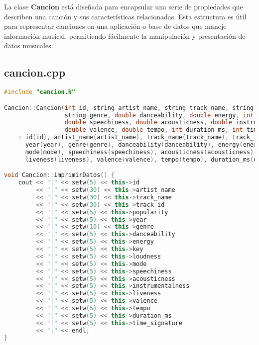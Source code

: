 \documentclass[corference]{IEEEtran}
\begin{document}
\begin{flushleft}
            \noindent\hspace*{4em}La clase \textbf{Cancion} está diseñada para encapsular una serie de propiedades que describen una canción y sus características relacionadas. Esta estructura es útil para representar canciones en una aplicación o base de datos que maneje información musical, permitiendo fácilmente la manipulación y presentación de datos musicales.
            \subsection{cancion.cpp}
            \begin{lstlisting}[language=C++, style=mystyle, caption={Código de un Clase Canción}]
#include "cancion.h"

Cancion::Cancion(int id, string artist_name, string track_name, string track_id, int popularity, int year,
                 string genre, double danceability, double energy, int key, double loudness, int mode,
                 double speechiness, double acousticness, double instrumentalness, double liveness,
                 double valence, double tempo, int duration_ms, int time_signature)
    : id(id), artist_name(artist_name), track_name(track_name), track_id(track_id), popularity(popularity),
      year(year), genre(genre), danceability(danceability), energy(energy), key(key), loudness(loudness),
      mode(mode), speechiness(speechiness), acousticness(acousticness), instrumentalness(instrumentalness),
      liveness(liveness), valence(valence), tempo(tempo), duration_ms(duration_ms), time_signature(time_signature) {}

void Cancion::imprimirDatos() {
    cout << "|" << setw(5) << this->id
         << "|" << setw(30) << this->artist_name
         << "|" << setw(30) << this->track_name
         << "|" << setw(30) << this->track_id
         << "|" << setw(5) << this->popularity
         << "|" << setw(5) << this->year
         << "|" << setw(10) << this->genre
         << "|" << setw(5) << this->danceability
         << "|" << setw(5) << this->energy
         << "|" << setw(5) << this->key
         << "|" << setw(5) << this->loudness
         << "|" << setw(5) << this->mode
         << "|" << setw(5) << this->speechiness
         << "|" << setw(5) << this->acousticness
         << "|" << setw(5) << this->instrumentalness
         << "|" << setw(5) << this->liveness
         << "|" << setw(5) << this->valence
         << "|" << setw(5) << this->tempo
         << "|" << setw(5) << this->duration_ms
         << "|" << setw(5) << this->time_signature
         << "|" << endl;
}


\end{lstlisting}
\end{flushleft}
\end{document}
